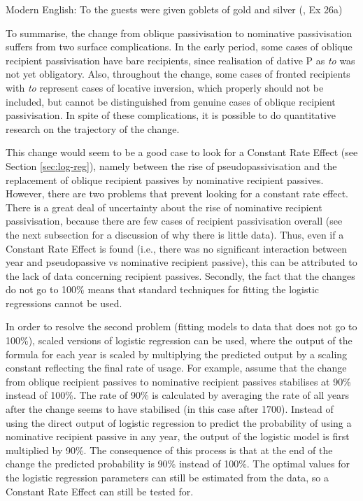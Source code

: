 	\begin{exe}
		\ex Modern English: To the guests were given goblets of gold and silver (\citealt{Bruening.2010}, Ex 26a)\label{ex:locinv}
	\end{exe}

	To summarise, the change from oblique passivisation to nominative passivisation suffers from two surface complications. In the early period, some cases of oblique recipient passivisation have bare recipients, since realisation of dative P as \textit{to} was not yet obligatory. Also, throughout the change, some cases of fronted recipients with \textit{to} represent cases of locative inversion, which properly should not be included, but cannot be distinguished from genuine cases of oblique recipient passivisation. In spite of these complications, it is possible to do quantitative research on the trajectory of the change.

	This change would seem to be a good case to look for a Constant Rate Effect (see Section \ref{sec:log-reg}), namely between the rise of pseudopassivisation and the replacement of oblique recipient passives by nominative recipient passives. However, there are two problems that prevent looking for a constant rate effect. There is a great deal of uncertainty about the rise of nominative recipient passivisation, because there are few cases of recipient passivisation overall (see the next subsection for a discussion of why there is little data). Thus, even if a Constant Rate Effect is found (i.e., there was no significant interaction between year and pseudopassive vs nominative recipient passive), this can be attributed to the lack of data concerning recipient passives. Secondly, the fact that the changes do not go to 100\% means that standard techniques for fitting the logistic regressions cannot be used.

	In order to resolve the second problem (fitting models to data that does not go to 100\%), scaled versions of logistic regression can be used, where the output of the formula for each year is scaled by multiplying the predicted output by a scaling constant reflecting the final rate of usage. For example, assume that the change from oblique recipient passives to nominative recipient passives stabilises at 90\% instead of 100\%. The rate of 90\% is calculated by averaging the rate of all years after the change seems to have stabilised (in this case after 1700). Instead of using the direct output of logistic regression to predict the probability of using a nominative recipient passive in any year, the output of the logistic model is first multiplied by 90\%. The consequence of this process is that at the end of the change the predicted probability is 90\% instead of 100\%. The optimal values for the logistic regression parameters can still be estimated from the data, so a Constant Rate Effect can still be tested for. 

